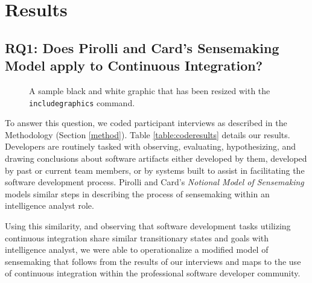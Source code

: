 \documentclass{sig-alternate}
\begin{document}
\section{Results}

\subsection{RQ1:  Does Pirolli and Card's Sensemaking Model apply to Continuous Integration?}
\begin{figure}
\centering
{}
\caption{A sample black and white graphic
that has been resized with the \texttt{includegraphics} command.} \label{figure:sensemaking_model}
\end{figure}

To answer this question, we coded participant interviews as described in the Methodology (Section \ref{method}). Table \ref{table:coderesults} details our results. Developers are routinely tasked with observing, evaluating, hypothesizing, and drawing conclusions about software artifacts either developed by them, developed by past or current team members, or by systems built to assist in facilitating the software development process. Pirolli and Card's \textit{Notional Model of Sensemaking}\cite{pirolli:sensemaking} models similar steps in describing the process of sensemaking within an intelligence analyst role.

Using this similarity, and observing that software development tasks utilizing continuous integration share similar transitionary states and goals with intelligence analyst, we were able to operationalize a modified model of sensemaking that follows from the results of our interviews and maps to the use of continuous integration within the professional software developer community.
\end{document}
